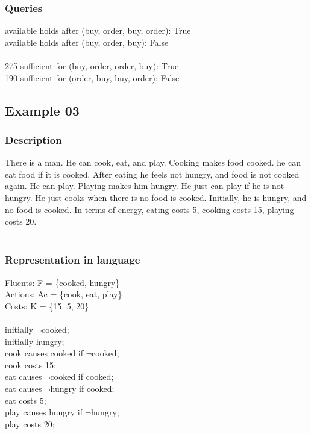 \documentclass[11pt]{article}
\begin{document}
	\subsubsection{Queries}
	available holds after (buy, order, buy, order): True\\
	available holds after (buy, order, buy): False\\
	\\
	275 sufficient for (buy, order, order, buy): True\\
	190 sufficient for (order, buy, buy, order): False\\
	\subsection{Example 03}
	\subsubsection{Description}\label{par:p103}
	There is a man. He can cook, eat, and play. Cooking makes food cooked. he can eat food if it is cooked. After eating he feels not hungry, and food is not cooked again. He can play. Playing makes him hungry. He just can play if he is not hungry. He just cooks when there is no food is cooked. Initially, he is hungry, and no food is cooked. In terms of energy, eating costs 5, cooking costs 15, playing costs 20.\\
	\\
	\subsubsection{Representation in language}\label{par:p203}
	Fluents: F = \{cooked, hungry\}\\
	Actions: Ac = \{cook, eat, play\}\\
	Costs: K = \{15, 5, 20\}
	\\
	\\
	initially $\neg$cooked;\\
	initially hungry;\\
	cook causes cooked if $\neg$cooked;\\
	cook costs 15;\\
	eat causes $\neg$cooked if cooked;\\
	eat causes $\neg$hungry if cooked;\\
	eat costs 5;\\
	play causes hungry if $\neg$hungry;\\
	play costs 20;\\
	\\
\end{document}

